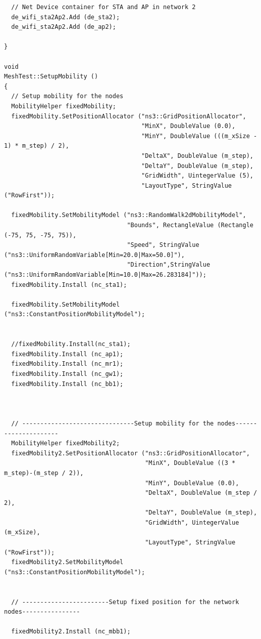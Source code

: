 \documentclass[12pt,a4paper]{report}
\begin{document}
\begin{verbatim}
  // Net Device container for STA and AP in network 2
  de_wifi_sta2Ap2.Add (de_sta2);
  de_wifi_sta2Ap2.Add (de_ap2);

}

void
MeshTest::SetupMobility ()
{
  // Setup mobility for the nodes
  MobilityHelper fixedMobility;
  fixedMobility.SetPositionAllocator ("ns3::GridPositionAllocator",
                                      "MinX", DoubleValue (0.0),
                                      "MinY", DoubleValue (((m_xSize - 1) * m_step) / 2),
                                      "DeltaX", DoubleValue (m_step),
                                      "DeltaY", DoubleValue (m_step),
                                      "GridWidth", UintegerValue (5),
                                      "LayoutType", StringValue ("RowFirst"));

  fixedMobility.SetMobilityModel ("ns3::RandomWalk2dMobilityModel",
                                  "Bounds", RectangleValue (Rectangle (-75, 75, -75, 75)),
                                  "Speed", StringValue ("ns3::UniformRandomVariable[Min=20.0|Max=50.0]"),
                                  "Direction",StringValue ("ns3::UniformRandomVariable[Min=10.0|Max=26.283184]"));
  fixedMobility.Install (nc_sta1);

  fixedMobility.SetMobilityModel ("ns3::ConstantPositionMobilityModel");


  //fixedMobility.Install(nc_sta1);
  fixedMobility.Install (nc_ap1);
  fixedMobility.Install (nc_mr1);
  fixedMobility.Install (nc_gw1);
  fixedMobility.Install (nc_bb1);



  // -------------------------------Setup mobility for the nodes---------------------
  MobilityHelper fixedMobility2;
  fixedMobility2.SetPositionAllocator ("ns3::GridPositionAllocator",
                                       "MinX", DoubleValue ((3 * m_step)-(m_step / 2)),
                                       "MinY", DoubleValue (0.0),
                                       "DeltaX", DoubleValue (m_step / 2),
                                       "DeltaY", DoubleValue (m_step),
                                       "GridWidth", UintegerValue (m_xSize),
                                       "LayoutType", StringValue ("RowFirst"));
  fixedMobility2.SetMobilityModel ("ns3::ConstantPositionMobilityModel");


  // ------------------------Setup fixed position for the network nodes----------------

  fixedMobility2.Install (nc_mbb1);




\end{verbatim}
\end{document}
